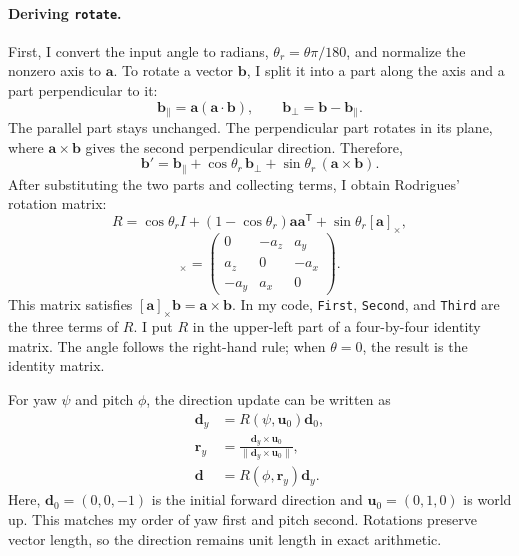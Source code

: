 \documentclass[acmtog]{acmart}
\begin{document}
\paragraph{Deriving \texttt{rotate}.}
First, I convert the input angle to radians, $\theta_r=\theta\pi/180$, and normalize the nonzero axis to $\mathbf a$. To rotate a vector $\mathbf b$, I split it into a part along the axis and a part perpendicular to it:
\begin{equation}
\mathbf b_\parallel=\mathbf a(\mathbf a\cdot\mathbf b),
\qquad
\mathbf b_\perp=\mathbf b-\mathbf b_\parallel.
\end{equation}
The parallel part stays unchanged. The perpendicular part rotates in its plane, where $\mathbf a\times\mathbf b$ gives the second perpendicular direction. Therefore,
\begin{equation}
\mathbf b'=\mathbf b_\parallel+
\cos\theta_r\,\mathbf b_\perp+
\sin\theta_r\,(\mathbf a\times\mathbf b).
\end{equation}
After substituting the two parts and collecting terms, I obtain Rodrigues' rotation matrix:
\begin{equation}
R=\cos\theta_r I+(1-\cos\theta_r)\mathbf a\mathbf a^{\mathsf T}
+\sin\theta_r[\mathbf a]_\times,
\end{equation}
\begin{equation}
[\mathbf a]_\times=
\begin{pmatrix}
0&-a_z&a_y\\
a_z&0&-a_x\\
-a_y&a_x&0
\end{pmatrix}.
\end{equation}
This matrix satisfies $[\mathbf a]_\times\mathbf b=\mathbf a\times\mathbf b$. In my code, \texttt{First}, \texttt{Second}, and \texttt{Third} are the three terms of $R$. I put $R$ in the upper-left part of a four-by-four identity matrix. The angle follows the right-hand rule; when $\theta=0$, the result is the identity matrix.

For yaw $\psi$ and pitch $\phi$, the direction update can be written as
\begin{equation}
\begin{aligned}
\mathbf d_y&=R(\psi,\mathbf u_0)\mathbf d_0,\\
\mathbf r_y&=\frac{\mathbf d_y\times\mathbf u_0}{\|\mathbf d_y\times\mathbf u_0\|},\\
\mathbf d&=R(\phi,\mathbf r_y)\mathbf d_y.
\end{aligned}
\end{equation}
Here, $\mathbf d_0=(0,0,-1)$ is the initial forward direction and $\mathbf u_0=(0,1,0)$ is world up. This matches my order of yaw first and pitch second. Rotations preserve vector length, so the direction remains unit length in exact arithmetic.
\end{document}
